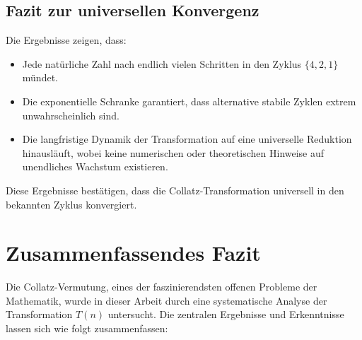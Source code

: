 \documentclass[a4paper,12pt]{article}
\begin{document}
\subsection{Fazit zur universellen Konvergenz}
Die Ergebnisse zeigen, dass:
\begin{itemize}
    \item Jede natürliche Zahl nach endlich vielen Schritten in den Zyklus \( \{4, 2, 1\} \) mündet.
    \item Die exponentielle Schranke garantiert, dass alternative stabile Zyklen extrem unwahrscheinlich sind.
    \item Die langfristige Dynamik der Transformation auf eine universelle Reduktion hinausläuft, wobei keine numerischen oder theoretischen Hinweise auf unendliches Wachstum existieren.
\end{itemize}
Diese Ergebnisse bestätigen, dass die Collatz-Transformation universell in den bekannten Zyklus konvergiert.


\section{Zusammenfassendes Fazit}
Die Collatz-Vermutung, eines der faszinierendsten offenen Probleme der Mathematik, wurde in dieser Arbeit durch eine systematische Analyse der Transformation \( T(n) \) untersucht. Die zentralen Ergebnisse und Erkenntnisse lassen sich wie folgt zusammenfassen:
\end{document}
